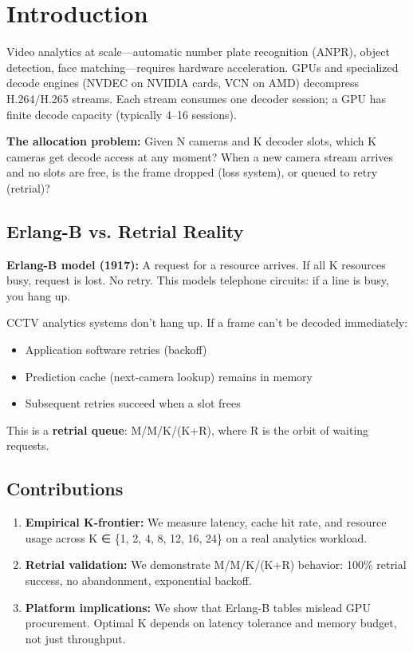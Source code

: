 \documentclass[sigconf,review]{acmart}
\begin{document}

\maketitle

\section{Introduction}

Video analytics at scale—automatic number plate recognition (ANPR), object detection, face matching—requires
hardware acceleration. GPUs and specialized decode engines (NVDEC on NVIDIA cards, VCN on AMD) decompress H.264/H.265
streams. Each stream consumes one decoder session; a GPU has finite decode capacity (typically 4–16 sessions).

\textbf{The allocation problem:} Given N cameras and K decoder slots, which K cameras get decode access at any moment?
When a new camera stream arrives and no slots are free, is the frame dropped (loss system), or queued to retry (retrial)?

\subsection{Erlang-B vs. Retrial Reality}

\textbf{Erlang-B model (1917):} A request for a resource arrives. If all K resources busy, request is lost. No retry.
This models telephone circuits: if a line is busy, you hang up.

CCTV analytics systems don't hang up. If a frame can't be decoded immediately:
\begin{itemize}
  \item Application software retries (backoff)
  \item Prediction cache (next-camera lookup) remains in memory
  \item Subsequent retries succeed when a slot frees
\end{itemize}

This is a \textbf{retrial queue}: M/M/K/(K+R), where R is the orbit of waiting requests.

\subsection{Contributions}

\begin{enumerate}
  \item \textbf{Empirical K-frontier:} We measure latency, cache hit rate, and resource usage across K ∈ \{1, 2, 4, 8, 12, 16, 24\} on a real analytics workload.
  \item \textbf{Retrial validation:} We demonstrate M/M/K/(K+R) behavior: 100\% retrial success, no abandonment, exponential backoff.
  \item \textbf{Platform implications:} We show that Erlang-B tables mislead GPU procurement. Optimal K depends on latency tolerance and memory budget, not just throughput.
\end{enumerate}
\end{document}
